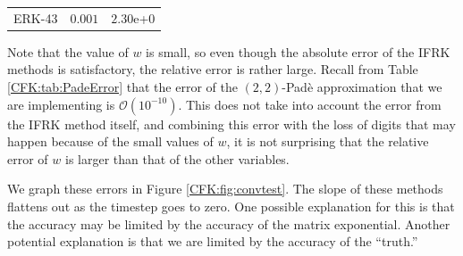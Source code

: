 \documentclass{csri19}
\begin{document}
\begin{table}[ht]
{{\begin{tabular}{c|c|c}
      ERK-43          & $0.001$           & $2.30$e+$0$
    \end{tabular}}}\quad
\end{table}

Note that the value of $w$ is small, so even though the absolute error 
of the IFRK methods is satisfactory, the relative error is rather
 large. Recall from Table \ref{CFK:tab:PadeError} that the error of the 
$(2,2)$-Pad\`e approximation that we are implementing is $\mathcal{O}(10^{-10})$.
This does not take into account the error from the IFRK method itself, 
and combining this error with the loss of digits that may happen because of 
the small values of $w$, it is not surprising that the relative error of 
$w$ is larger than that of the other variables.

We graph these errors in Figure \ref{CFK:fig:convtest}. The slope of these 
methods flattens out as the timestep goes to zero. One possible 
explanation for this is that the accuracy may be limited by the accuracy of 
the matrix exponential. Another potential explanation is that we are 
limited by the accuracy of the ``truth.'' 
\end{document}
